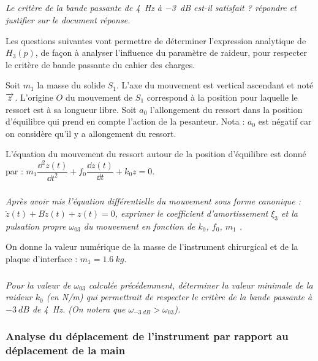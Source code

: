 \begin{multicols}{2}
\subparagraph{}\textit{Le critère de la bande passante de \SI{4}{Hz} à  \SI{-3}{dB} est-il satisfait ? répondre et justifier sur le document réponse.}
\ifprof
\begin{corrige}
\end{corrige}
\else
\fi



Les questions suivantes vont permettre de déterminer l’expression analytique de $H_3(p)$, de façon à analyser l’influence du paramètre de raideur, pour respecter le critère de bande passante du cahier des charges.

Soit $m_1$ la masse du solide $S_1$. L’axe du mouvement est vertical ascendant et noté $\overrightarrow{z}$. L’origine $O$ du mouvement de $S_1$ correspond à la position pour laquelle le ressort est à sa longueur libre.
Soit $a_0$ l’allongement du ressort dans la position d’équilibre qui prend en compte l’action de la pesanteur. 
Nota : $a_0$ est négatif car on considère qu’il y a allongement du ressort.

L'équation du mouvement du ressort autour de la position d'équilibre est donné par : $m_1\dfrac{\dd^2 z(t)}{\dd t^2} + f_0 \dfrac{\dd z (t)}{\dd t}+k_0 z = 0$.

\subparagraph{}\textit{Après avoir mis l’équation différentielle du mouvement sous forme canonique : $\ddot{z}(t)+B\dot{z}(t)+z(t)=0$, exprimer le coefficient d’amortissement $\xi_3$ et la pulsation propre $\omega_{03}$ du mouvement en fonction de $k_0$, $f_0$, $m_1$ .}
\ifprof
\begin{corrige}
\end{corrige}
\else
\fi

On donne la valeur numérique de la masse de l’instrument chirurgical et de la plaque d’interface : $m_1 = \SI{1,6}{kg}$.


\subparagraph{}\textit{Pour la valeur de $\omega_{03}$ calculée précédemment, déterminer la valeur minimale de la raideur $k_0$ (en N/m) qui permettrait de respecter le critère de la bande passante à $\SI{-3}{dB}$ de \SI{4}{Hz}.
(On notera que $ \omega_{-\SI{3}{dB}}> \omega_{03}$).
}
\ifprof
\begin{corrige}
\end{corrige}
\else
\fi

\subsubsection{Analyse du déplacement de l’instrument par rapport au déplacement de la main}


\end{multicols}
